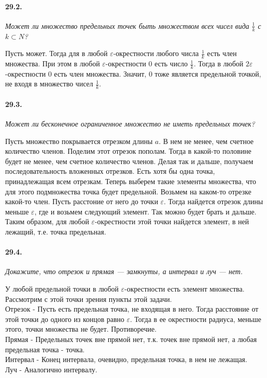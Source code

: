 \documentclass{book}
\begin{document}
	\paragraph{29.2.}
\textit{Может ли множество предельных точек быть множеством всех чисел вида $\frac{1}{k}$ с $k \subset N$?}

Пусть может. Тогда для в любой $\varepsilon$-окрестности любого числа $\frac{1}{k}$ есть член множества. При этом в любой $\varepsilon$-окрестности 0 есть число $\frac{1}{k}$. Тогда в любой $2\varepsilon$-окрестности 0 есть член множества. Значит, 0 тоже является предельной точкой, не входя в множество чисел $\frac{1}{k}$.

\paragraph{29.3.}
\textit{Может ли бесконечное ограниченное множество не иметь предельных точек?}

Пусть множество покрывается отрезком длины $a$. В нем не менее, чем счетное количество членов. Поделим этот отрезок пополам. Тогда в какой-то половине будет не менее, чем счетное количество членов. Делая так и дальше, получаем последовательность вложенных отрезков. Есть хотя бы одна точка, принадлежащая всем отрезкам. Теперь выберем такие элементы множества, что для этого подмножества точка будет предельной. Возьмем на каком-то отрезке какой-то член. Пусть расстоние от него до точки $\varepsilon$. Тогда найдется отрезок длины меньше $\varepsilon$, где и возьмем следующий элемент. Так можно будет брать и дальше. Таким образом, для любой $\varepsilon$-окрестности этой точки найдется элемент, в ней лежащий, т.е. точка предельная.
	
\paragraph{29.4.}
\textit{Докажите, что отрезок и прямая — замкнуты, а интервал и луч — нет.}

У любой предельной точки в любой $\varepsilon$-окрестности есть элемент множества. Рассмотрим с этой точки зрения пункты этой задачи. \\
Отрезок - Пусть есть предельная точка, не входящая в него. Тогда расстояние от этой точки до одного из концов равно $\varepsilon$. Тогда в ее окрестности радиуса, меньше этого, точки множества не будет. Противоречие.\\
Прямая - Предельных точек вне прямой нет, т.к. точек вне прямой нет, а любая предельная точка - точка.\\
Интервал - Конец интервала, очевидно, предельная точка, в нем не лежащая. \\
Луч - Аналогично интервалу. 
\end{document}
